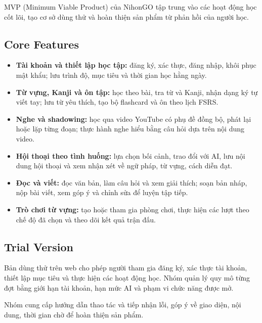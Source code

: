 MVP (Minimum Viable Product) của NihonGO tập trung vào các hoạt động học cốt lõi, tạo cơ sở dùng thử và hoàn thiện sản phẩm từ phản hồi của người học.

\subsection{Core Features}

\begin{itemize}[leftmargin=*,itemsep=2pt,parsep=0pt,topsep=3pt]
  \item \textbf{Tài khoản và thiết lập học tập:} đăng ký, xác thực, đăng nhập, khôi phục mật khẩu; lưu trình độ, mục tiêu và thời gian học hằng ngày.
  \item \textbf{Từ vựng, Kanji và ôn tập:} học theo bài, tra từ và Kanji, nhận dạng ký tự viết tay; lưu từ yêu thích, tạo bộ flashcard và ôn theo lịch FSRS.
  \item \textbf{Nghe và shadowing:} học qua video YouTube có phụ đề đồng bộ, phát lại hoặc lặp từng đoạn; thực hành nghe hiểu bằng câu hỏi dựa trên nội dung video.
  \item \textbf{Hội thoại theo tình huống:} lựa chọn bối cảnh, trao đổi với AI, lưu nội dung hội thoại và xem nhận xét về ngữ pháp, từ vựng, cách diễn đạt.
  \item \textbf{Đọc và viết:} đọc văn bản, làm câu hỏi và xem giải thích; soạn bản nháp, nộp bài viết, xem góp ý và chỉnh sửa để luyện tập tiếp.
  \item \textbf{Trò chơi từ vựng:} tạo hoặc tham gia phòng chơi, thực hiện các lượt theo chế độ đã chọn và theo dõi kết quả trận đấu.
\end{itemize}

\subsection{Trial Version}

Bản dùng thử trên web cho phép người tham gia đăng ký, xác thực tài khoản, thiết lập mục tiêu và thực hiện các hoạt động học. Nhóm quản lý quy mô từng đợt bằng giới hạn tài khoản, hạn mức AI và phạm vi chức năng được mở.

Nhóm cung cấp hướng dẫn thao tác và tiếp nhận lỗi, góp ý về giao diện, nội dung, thời gian chờ để hoàn thiện sản phẩm.

